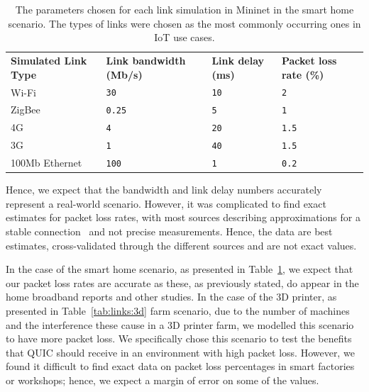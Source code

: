 \begin{table}[ht]
    \caption{The parameters chosen for each link simulation in Mininet in the smart home scenario. The types of links were chosen as the most commonly occurring ones in IoT use cases.}\label{tab:links:home}
    \begin{tabular}{@{}llll@{}}
        \toprule
        \textbf{Simulated Link Type} & \textbf{Link bandwidth (Mb/s)} & \textbf{Link delay (ms)} & \textbf{Packet loss rate (\%)} \\
        Wi-Fi                        & \texttt{30}                    & \texttt{10}              & \texttt{2}                     \\
        ZigBee                       & \texttt{0.25}                  & \texttt{5}               & \texttt{1}                     \\
        4G                           & \texttt{4}                     & \texttt{20}              & \texttt{1.5}                   \\
        3G                           & \texttt{1}                     & \texttt{40}              & \texttt{1.5}                   \\
        100Mb Ethernet               & \texttt{100}                   & \texttt{1}               & \texttt{0.2}                   \\
        \bottomrule
    \end{tabular}
\end{table}

Hence, we expect that the bandwidth and link delay numbers accurately represent a real-world scenario.
However, it was complicated to find exact estimates for packet loss rates, with most sources describing approximations for a stable connection~\citep{sdu_ictp-sdu_2013} and not precise measurements.
Hence, the data are best estimates, cross-validated through the different sources and are not exact values.

In the case of the smart home scenario, as presented in Table~\ref{tab:links:home}, we expect that our packet loss rates are accurate as these, as previously stated, do appear in the home broadband reports and other studies.
In the case of the 3D printer, as presented in Table~\ref{tab:links:3d} farm scenario, due to the number of machines and the interference these cause in a 3D printer farm, we modelled this scenario to have more packet loss.
We specifically chose this scenario to test the benefits that QUIC should receive in an environment with high packet loss.
However, we found it difficult to find exact data on packet loss percentages in smart factories or workshops; hence, we expect a margin of error on some of the values.

